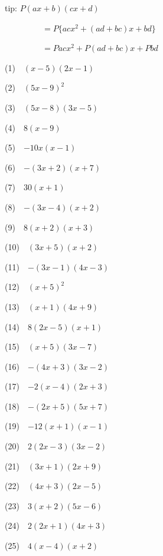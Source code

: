 \documentclass[a4j,twocolumn,10pt,fleqn]{jarticle}
\begin{document}
tip: $P(ax + b)(cx + d)$

~~~~~~~~~$= P\{acx^2 + (ad + bc)x +bd\}$

~~~~~~~~~$= Pacx^2 + P(ad + bc)x + Pbd$

(1)~~$(x-5)(2x-1)$

(2)~~$(5x-9)^2$

(3)~~$(5x-8)(3x-5)$

(4)~~$8(x-9)$

(5)~~$-10x(x-1)$

(6)~~$-(3x+2)(x+7)$

(7)~~$30(x+1)$

(8)~~$-(3x-4)(x+2)$

(9)~~$8(x+2)(x+3)$

(10)~~$(3x+5)(x+2)$

(11)~~$-(3x-1)(4x-3)$

(12)~~$(x+5)^2$

(13)~~$(x+1)(4x+9)$

(14)~~$8(2x-5)(x+1)$

(15)~~$(x+5)(3x-7)$

(16)~~$-(4x+3)(3x-2)$

(17)~~$-2(x-4)(2x+3)$

(18)~~$-(2x+5)(5x+7)$

(19)~~$-12(x+1)(x-1)$

(20)~~$2(2x-3)(3x-2)$

(21)~~$(3x+1)(2x+9)$

(22)~~$(4x+3)(2x-5)$

(23)~~$3(x+2)(5x-6)$

(24)~~$2(2x+1)(4x+3)$

(25)~~$4(x-4)(x+2)$
\end{document}
